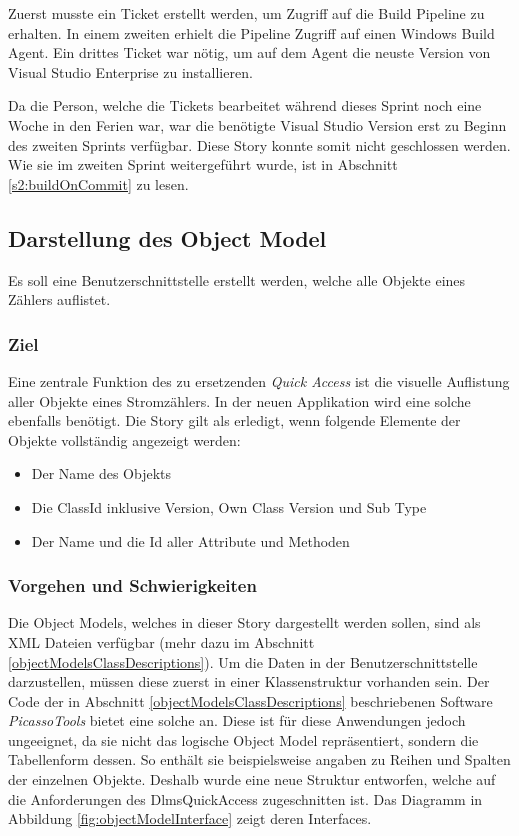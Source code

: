 Zuerst musste ein Ticket erstellt werden, um Zugriff auf die Build Pipeline zu erhalten.
In einem zweiten erhielt die Pipeline Zugriff auf einen Windows Build Agent.
Ein drittes Ticket war nötig, um auf dem Agent die neuste Version von Visual Studio Enterprise zu installieren.

Da die Person, welche die Tickets bearbeitet während dieses Sprint noch eine Woche in den Ferien war, war die benötigte Visual Studio Version erst zu Beginn des zweiten Sprints verfügbar.
Diese Story konnte somit nicht geschlossen werden.
Wie sie im zweiten Sprint weitergeführt wurde, ist in Abschnitt \ref{s2:buildOnCommit} zu lesen.


\subsection{Darstellung des Object Model}\label{visualizeOM}
\dq Es soll eine Benutzerschnittstelle erstellt werden, welche alle Objekte eines Zählers auflistet.\dq

\subsubsection{Ziel}
Eine zentrale Funktion des zu ersetzenden \textit{Quick Access} ist die visuelle Auflistung aller Objekte eines Stromzählers.
In der neuen Applikation wird eine solche ebenfalls benötigt.
Die Story gilt als erledigt, wenn folgende Elemente der Objekte vollständig angezeigt werden:
\begin{itemize}
   \item Der Name des Objekts
   \item Die ClassId inklusive Version, Own Class Version und Sub Type
   \item Der Name und die Id aller Attribute und Methoden
\end{itemize}

\subsubsection{Vorgehen und Schwierigkeiten}\label{objectModelDevSchwierigkeiten}
Die Object Models, welches in dieser Story dargestellt werden sollen, sind als XML Dateien verfügbar (mehr dazu im Abschnitt \ref{objectModelsClassDescriptions}).
Um die Daten in der Benutzerschnittstelle darzustellen, müssen diese zuerst in einer Klassenstruktur vorhanden sein.
Der Code der in Abschnitt \ref{objectModelsClassDescriptions} beschriebenen Software \textit{PicassoTools} bietet eine solche an.
Diese ist für diese Anwendungen jedoch ungeeignet, da sie nicht das logische Object Model repräsentiert, sondern die Tabellenform dessen.
So enthält sie beispielsweise angaben zu Reihen und Spalten der einzelnen Objekte.
Deshalb wurde eine neue Struktur entworfen, welche auf die Anforderungen des DlmsQuickAccess zugeschnitten ist.
Das Diagramm in Abbildung \ref{fig:objectModelInterface} zeigt deren Interfaces.

